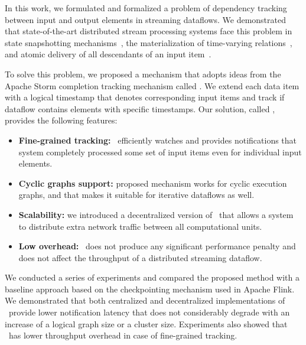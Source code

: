 \label {fs-acker-conclusion}

In this work, we formulated and formalized a problem of dependency tracking between input and output elements in streaming dataflows. We demonstrated that state-of-the-art distributed stream processing systems face this problem in state snapshotting mechanisms~\cite{Carbone:2017:SMA:3137765.3137777, apache:storm}, the materialization of time-varying relations~\cite{Begoli:2019:OSR:3299869.3314040}, and atomic delivery of all descendants of an input item~\cite{we2018adbis}.  

To solve this problem, we proposed a mechanism that adopts ideas from the Apache Storm completion tracking mechanism called \acker. We extend each data item with a logical timestamp that denotes corresponding input items and track if dataflow contains elements with specific timestamps. Our solution, called \tracker, provides the following features:
\begin{itemize}
    \item {\bf Fine-grained tracking:} \tracker\ efficiently watches and provides notifications that system completely processed some set of input items even for individual input elements.
    \item {\bf Cyclic graphs support:} proposed mechanism works for cyclic execution graphs, and that makes it suitable for iterative dataflows as well. 
    \item {\bf Scalability:} we introduced a decentralized version of \tracker\ that allows a system to distribute extra network traffic between all computational units. 
    \item {\bf Low overhead:} \tracker\ does not produce any significant performance penalty and does not affect the throughput of a distributed streaming dataflow.
\end{itemize}

We conducted a series of experiments and compared the proposed method with a baseline approach based on the checkpointing mechanism used in Apache Flink. We demonstrated that both centralized and decentralized implementations of \tracker\ provide lower notification latency that does not considerably degrade with an increase of a logical graph size or a cluster size. Experiments also showed that \tracker\ has lower throughput overhead in case of fine-grained tracking.